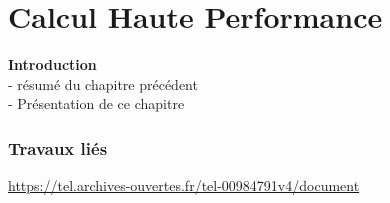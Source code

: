 \chapter{Calcul Haute Performance}\label{chap:hpc}
\minitoc

\textbf{Introduction}\\
- résumé du chapitre précédent\\
- Présentation de ce chapitre\\




\newpage



\newpage



\newpage

%

\newpage

%

\newpage





\printbibliography[heading=references,segment=\therefsegment]

\subsection{Travaux liés}
\url{https://tel.archives-ouvertes.fr/tel-00984791v4/document}

